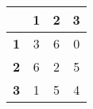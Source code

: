 \begin{tabular}{l|ccc}
\toprule
&\textbf{1} & \textbf{2} & \textbf{3}\\
\midrule
\textbf{1} & 3 & 6 & 0\\
\textbf{2} & 6 & 2 & 5\\
\textbf{3} & 1 & 5 & 4\\
\bottomrule
\end{tabular}
